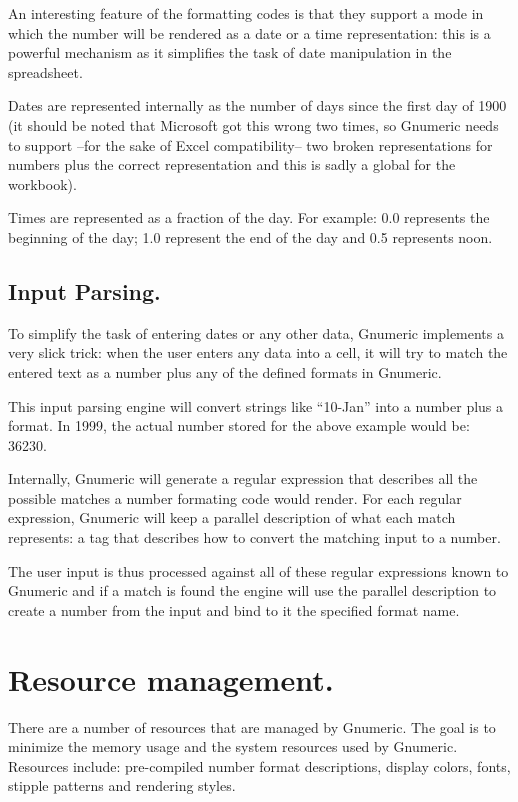 \documentclass[12pt,twoside,twocolumn]{article}
\begin{document}
An interesting feature of the formatting codes is that they support a
mode in which the number will be rendered as a date or a time
representation: this is a powerful mechanism as it simplifies the task
of date manipulation in the spreadsheet.

Dates are represented internally as the number of days since the first
day of 1900 (it should be noted that Microsoft got this wrong two
times, so Gnumeric needs to support --for the sake of Excel
compatibility-- two broken representations for numbers plus the
correct representation and this is sadly a global for the workbook).

Times are represented as a fraction of the day.  For example: 0.0
represents the beginning of the day; 1.0 represent the end of the day
and 0.5 represents noon. 

\subsection{Input Parsing.}

To simplify the task of entering dates or any other data, Gnumeric
implements a very slick trick: when the user enters any data into a
cell, it will try to match the entered text as a number plus any of
the defined formats in Gnumeric.

This input parsing engine will convert strings like ``10-Jan'' 
into a number plus a format.  In 1999, the actual number stored for
the above example would be: 36230. 

Internally, Gnumeric will generate a regular expression that describes
all the possible matches a number formating code would render.
For each regular expression, Gnumeric will keep a parallel description
of what each match represents: a tag that describes how to convert the
matching input to a number.

The user input is thus processed against all of these regular
expressions known to Gnumeric and if a match is found the engine will
use the parallel description to create a number from the input and bind
to it the specified format name.

\section{Resource management.}

There are a number of resources that are managed by Gnumeric.  The
goal is to minimize the memory usage and the system resources used by
Gnumeric.   Resources include: pre-compiled number format
descriptions, display colors, fonts, stipple patterns and rendering
styles. 
\end{document}
